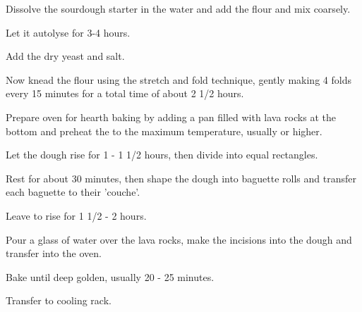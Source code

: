 \begin{method}		
     	Dissolve the sourdough starter in the water and add the flour and mix coarsely.

	Let it autolyse for 3-4 hours.

	Add the dry yeast and salt.

	Now knead the flour using the stretch and fold technique, gently making 4 folds  every 15 minutes for a total time of about 2 1/2 hours.

	Prepare oven for hearth baking by adding a pan filled with lava rocks at the bottom and preheat the to the maximum temperature, usually  or higher.

	Let the dough rise for 1 - 1 1/2 hours, then divide into equal rectangles.

	Rest for about 30 minutes, then shape the dough into baguette rolls and transfer each baguette to their 'couche'.

	Leave to rise for 1 1/2 - 2 hours.

	Pour a glass of water over the lava rocks, make the incisions into the dough and transfer into the oven.

	Bake until deep golden,  usually 20 - 25 minutes.

	Transfer to cooling rack.

\end {method}

